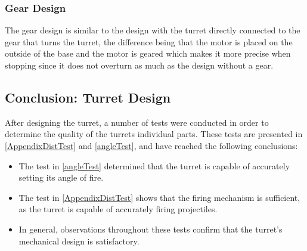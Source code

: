 \subsubsection{Gear Design}
The gear design is similar to the design with the turret directly connected to
the gear that turns the turret, the difference being that the motor is placed on
the outside of the base and the motor is geared which makes it more precise when
stopping since it does not overturn as much as the design without a gear.

\subsection{Conclusion: Turret Design}
After designing the turret, a number of tests were conducted in order to
determine the quality of the turrets individual parts. These tests are
presented in \autoref{AppendixDistTest} and \autoref{angleTest}, and have
reached the following conclusions:\nl

\begin{itemize}
  \item The test in \autoref{angleTest} determined that the turret is capable of
  accurately setting its angle of fire.
  \item The test in \autoref{AppendixDistTest} shows that the firing mechanism
  is sufficient, as the turret is capable of accurately firing projectiles.
  \item In general, observations throughout these tests confirm that the
  turret's mechanical design is satisfactory.
\end{itemize}
